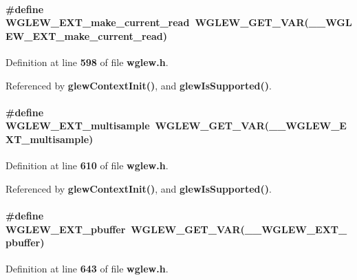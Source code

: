 \paragraph[{W\+G\+L\+E\+W\+\_\+\+E\+X\+T\+\_\+make\+\_\+current\+\_\+read}]{\setlength{\rightskip}{0pt plus 5cm}\#define W\+G\+L\+E\+W\+\_\+\+E\+X\+T\+\_\+make\+\_\+current\+\_\+read~{\bf W\+G\+L\+E\+W\+\_\+\+G\+E\+T\+\_\+\+V\+AR}({\bf \+\_\+\+\_\+\+W\+G\+L\+E\+W\+\_\+\+E\+X\+T\+\_\+make\+\_\+current\+\_\+read})}\label{wglew_8h_ab87823edd76b7c76f7affc8ec2499361}


Definition at line {\bf 598} of file {\bf wglew.\+h}.



Referenced by {\bf glew\+Context\+Init()}, and {\bf glew\+Is\+Supported()}.

\paragraph[{W\+G\+L\+E\+W\+\_\+\+E\+X\+T\+\_\+multisample}]{\setlength{\rightskip}{0pt plus 5cm}\#define W\+G\+L\+E\+W\+\_\+\+E\+X\+T\+\_\+multisample~{\bf W\+G\+L\+E\+W\+\_\+\+G\+E\+T\+\_\+\+V\+AR}({\bf \+\_\+\+\_\+\+W\+G\+L\+E\+W\+\_\+\+E\+X\+T\+\_\+multisample})}\label{wglew_8h_a4dda6b4b2f3d33a6d252b016f825c685}


Definition at line {\bf 610} of file {\bf wglew.\+h}.



Referenced by {\bf glew\+Context\+Init()}, and {\bf glew\+Is\+Supported()}.

\paragraph[{W\+G\+L\+E\+W\+\_\+\+E\+X\+T\+\_\+pbuffer}]{\setlength{\rightskip}{0pt plus 5cm}\#define W\+G\+L\+E\+W\+\_\+\+E\+X\+T\+\_\+pbuffer~{\bf W\+G\+L\+E\+W\+\_\+\+G\+E\+T\+\_\+\+V\+AR}({\bf \+\_\+\+\_\+\+W\+G\+L\+E\+W\+\_\+\+E\+X\+T\+\_\+pbuffer})}\label{wglew_8h_a485b78591d256e776596cef7bb83b241}


Definition at line {\bf 643} of file {\bf wglew.\+h}.



